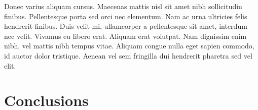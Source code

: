 \documentclass[sigconf]{acmart}
\begin{document}
Donec varius aliquam cursus. Maecenas mattis nisl sit amet nibh sollicitudin finibus. Pellentesque porta sed orci nec elementum. Nam ac urna ultricies felis hendrerit finibus. Duis velit mi, ullamcorper a pellentesque sit amet, interdum nec velit. Vivamus eu libero erat. Aliquam erat volutpat. Nam dignissim enim nibh, vel mattis nibh tempus vitae. Aliquam congue nulla eget sapien commodo, id auctor dolor tristique. Aenean vel sem fringilla dui hendrerit pharetra sed vel elit.




\section{Conclusions}


\end{document}
